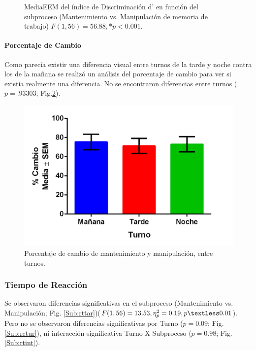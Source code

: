 \documentclass[12pt,letterpaper,final]{article}
\newcommand{\rpm}{\raisebox{.2ex}{$\scriptstyle\pm$}} %
\begin{document}
\begin{figure}[h]
	\caption{Media\rpm EEM del índice de Discriminación d’ en función del subproceso (Mantenimiento vs. Manipulación de memoria de trabajo) $F(1,56)= 56.88, *p <0.001.$}
	\label{fig:dprim}
\end{figure}

\paragraph{Porcentaje de Cambio}
Como parecía existir una diferencia visual entre turnos de la tarde y noche contra los de la mañana se realizó un análisis del porcentaje de cambio para ver si existía realmente una diferencia. No se encontraron diferencias entre turnos ($p=.93303$; Fig.\ref{fig:PCambio}).

\begin{figure}[h]

	\centering
	\includegraphics[scale=0.7]{graficas/PCambio.png}
	\caption{Porcentaje de cambio de mantenimiento y manipulación, entre turnos. }
	 	 
	\label{fig:PCambio}
\end{figure}


\subsubsection{Tiempo de Reacción}
Se observaron diferencias significativas en el subproceso (Mantenimiento vs. Manipulación; Fig. \ref{Sub:rttar})($F (1,56)= 13.53, \eta_{p}^{2}= 0.19, p\textless 0.01$). Pero no se observaron diferencias significativas por Turno ($p=0.09$; Fig. \ref{Sub:rctur}), ni interacción significativa Turno X Subproceso ($p=0.98$; Fig. \ref{Sub:rtint}).
\end{document}
